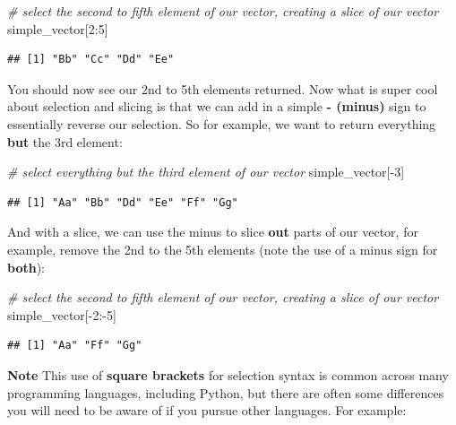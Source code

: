 \documentclass[
]{book}
\newenvironment{Shaded}{\begin{snugshade}}{\end{snugshade}}
\newcommand{\CommentTok}[1]{\textcolor[rgb]{0.56,0.35,0.01}{\textit{#1}}}
\newcommand{\DecValTok}[1]{\textcolor[rgb]{0.00,0.00,0.81}{#1}}
\newcommand{\NormalTok}[1]{#1}
\newcommand{\SpecialCharTok}[1]{\textcolor[rgb]{0.00,0.00,0.00}{#1}}
\begin{document}
\begin{Shaded}
\begin{Highlighting}[]
\CommentTok{\# select the second to fifth element of our vector, creating a \textquotesingle{}slice\textquotesingle{} of our vector}
\NormalTok{simple\_vector[}\DecValTok{2}\SpecialCharTok{:}\DecValTok{5}\NormalTok{]}
\end{Highlighting}
\end{Shaded}

\begin{verbatim}
## [1] "Bb" "Cc" "Dd" "Ee"
\end{verbatim}

You should now see our 2nd to 5th elements returned. Now what is super cool about selection and slicing is that we can add in a simple \textbf{- (minus)} sign to essentially reverse our selection. So for example, we want to return everything \textbf{but} the 3rd element:

\begin{Shaded}
\begin{Highlighting}[]
\CommentTok{\# select everything but the third element of our vector}
\NormalTok{simple\_vector[}\SpecialCharTok{{-}}\DecValTok{3}\NormalTok{]}
\end{Highlighting}
\end{Shaded}

\begin{verbatim}
## [1] "Aa" "Bb" "Dd" "Ee" "Ff" "Gg"
\end{verbatim}

And with a slice, we can use the minus to slice \textbf{out} parts of our vector, for example, remove the 2nd to the 5th elements (note the use of a minus sign for \textbf{both}):

\begin{Shaded}
\begin{Highlighting}[]
\CommentTok{\# select the second to fifth element of our vector, creating a \textquotesingle{}slice\textquotesingle{} of our vector}
\NormalTok{simple\_vector[}\SpecialCharTok{{-}}\DecValTok{2}\SpecialCharTok{:{-}}\DecValTok{5}\NormalTok{]}
\end{Highlighting}
\end{Shaded}

\begin{verbatim}
## [1] "Aa" "Ff" "Gg"
\end{verbatim}

\textbf{Note}
This use of \textbf{square brackets} for selection syntax is common across many programming languages, including Python, but there are often some differences you will need to be aware of if you pursue other languages. For example:
\end{document}
